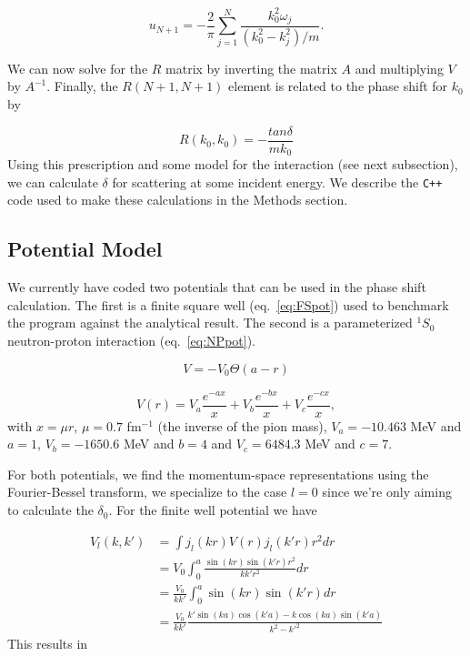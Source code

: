 \documentclass[10pt,showpacs,preprintnumbers,footinbib,amsmath,amssymb,aps,prl,twocolumn,groupedaddress,superscriptaddress,showkeys]{revtex4-1}
\begin{document}
\begin{equation}
     u_{N+1}=-\frac{2}{\pi}
          \sum_{j=1}^N\frac{k_0^2\omega_j}{(k_0^2-k_j^2)/m}.
\label{eq:u0}
\end{equation}

We can now solve for the $R$ matrix by inverting the matrix $A$ and multiplying $V$
by $A^{-1}$. Finally, the $R(N+1,N+1)$ element is related to the phase
shift for $k_0$ by

\begin{equation}
	R(k_0,k_0)=-\frac{tan\delta}{mk_0}
	\label{eq:PhaseShift}
\end{equation}
Using this prescription and some model for the interaction (see next
subsection), we can calculate $\delta$ for scattering at some incident energy.
We describe the \texttt{C++} code used to make these calculations in
the Methods section.


\subsection{Potential Model}

We currently have coded two potentials that can be used in the phase shift
calculation. The first is a finite square well (eq.~\ref{eq:FSpot}) used to
benchmark the program against the analytical result. The second is a
parameterized $^1S_0$ neutron-proton interaction (eq.~\ref{eq:NPpot}).

\begin{equation}
	V = -V_0 \Theta(a - r)
	\label{eq:FSpot}
\end{equation}

\begin{equation}
	V(r)=V_a \frac{e^{-ax}}{x}+V_b \frac{e^{-bx}}{x}+V_c \frac{e^{-cx}}{x},
	\label{eq:NPpot}
\end{equation}
with $x=\mu r$, $\mu=0.7$ fm$^{-1}$ (the inverse of the pion mass),
$V_a=-10.463$ MeV and $a=1$, $V_b=-1650.6$ MeV and $b=4$ and
$V_c=6484.3$ MeV and $c=7$.

For both potentials, we find the momentum-space representations using
the Fourier-Bessel transform, we specialize to the case $l=0$ since we're
only aiming to calculate the $\delta_0$. For the finite well potential we
have

\begin{align*}
	V_l(k,k')&= \int j_l(kr)V(r)j_l(k'r)r^2dr\\
	&= V_0 \int_0^a \frac{\sin(kr) \sin(k'r) r^2}{k k' r^2} dr\\
	&= \frac{V_0}{k k'} \int_0^a \sin(kr) \sin(k'r) dr\\
	&= \frac{V_0}{k k'} \frac{k' \sin(ka) \cos(k'a) - k \cos(ka) \sin(k'a)}{k^2 - k'^2}
\end{align*}
This results in 
\end{document}
